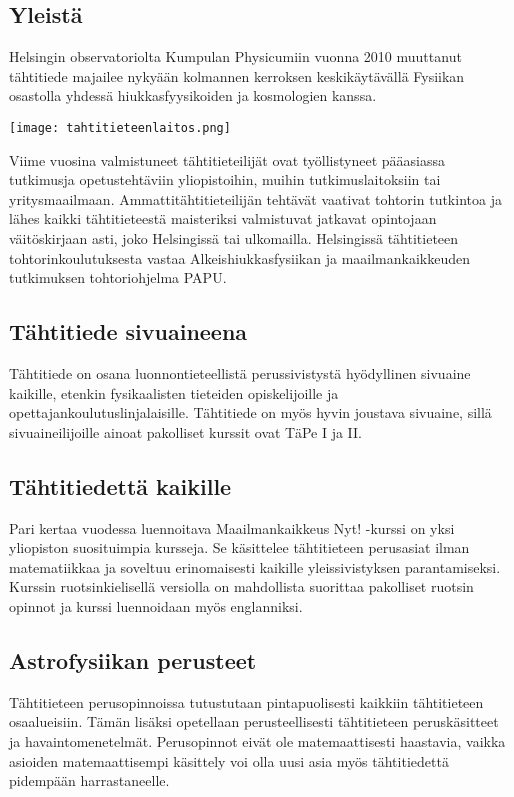 \documentclass[../ala_hataile.tex]{subfiles}
\begin{document}
\subsection*{Yleistä}
Helsingin observatoriolta Kumpulan
Physicumiin vuonna 2010 muuttanut
tähtitiede majailee nykyään
kolmannen kerroksen keskikäytävällä
Fysiikan osastolla
yhdessä hiukkasfyysikoiden ja kosmologien
kanssa.

\begin{figure*}[b!]
	\texttt{[image: tahtitieteenlaitos.png]}
\end{figure*}

Viime vuosina valmistuneet tähtitieteilijät
ovat työllistyneet pääasiassa tutkimusja
opetustehtäviin yliopistoihin, muihin
tutkimuslaitoksiin tai yritysmaailmaan.
Ammattitähtitieteilijän tehtävät vaativat
tohtorin tutkintoa ja lähes kaikki tähtitieteestä
maisteriksi valmistuvat jatkavat
opintojaan väitöskirjaan asti, joko Helsingissä
tai ulkomailla. Helsingissä tähtitieteen
tohtorinkoulutuksesta vastaa Alkeishiukkasfysiikan
ja maailmankaikkeuden
tutkimuksen tohtoriohjelma PAPU.

\subsection*{Tähtitiede sivuaineena}
Tähtitiede on osana luonnontieteellistä
perussivistystä hyödyllinen sivuaine kaikille,
etenkin fysikaalisten tieteiden opiskelijoille
ja opettajankoulutuslinjalaisille.
Tähtitiede on myös hyvin joustava sivuaine,
sillä sivuaineilijoille ainoat pakolliset
kurssit ovat TäPe I ja II.
\subsection*{Tähtitiedettä kaikille}
Pari kertaa vuodessa luennoitava Maailmankaikkeus
Nyt! -kurssi on yksi yliopiston
suosituimpia kursseja. Se käsittelee
tähtitieteen perusasiat ilman matematiikkaa
ja soveltuu erinomaisesti kaikille yleissivistyksen
parantamiseksi. Kurssin ruotsinkielisellä
versiolla on mahdollista suorittaa
pakolliset ruotsin opinnot ja kurssi luennoidaan
myös englanniksi.
\subsection*{Astrofysiikan perusteet}
Tähtitieteen perusopinnoissa tutustutaan
pintapuolisesti kaikkiin tähtitieteen osaalueisiin.
Tämän lisäksi opetellaan perusteellisesti
tähtitieteen peruskäsitteet ja havaintomenetelmät.
Perusopinnot eivät ole matemaattisesti haastavia, vaikka asioiden
matemaattisempi käsittely voi olla uusi asia
myös tähtitiedettä pidempään harrastaneelle.
\end{document}
